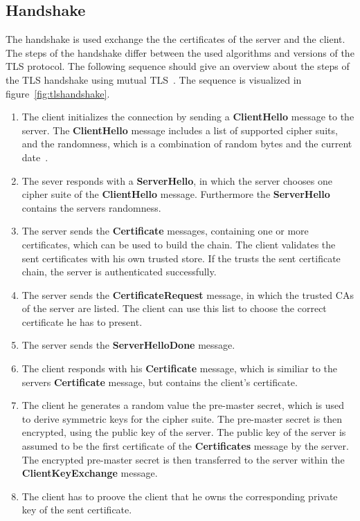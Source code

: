 \subsection{Handshake}
\label{sec:tlshandshake_details}
The handshake is used exchange the the certificates of the server and the client.
The steps of the handshake differ between the used algorithms and versions of the TLS protocol.
The following sequence should give an overview about the steps of the TLS handshake using mutual TLS~\cite{parsovs2013practical}.
The sequence is visualized in figure~\ref{fig:tlshandshake}.
\begin{enumerate}
	\item The client initializes the connection by sending a \textbf{ClientHello} message to the server.
		The \textbf{ClientHello} message includes a list of supported cipher suits, and the randomness, which is a combination of random bytes and the current date~\cite{mediumtls}.
	\item The sever responds with a \textbf{ServerHello}, in which the server chooses one cipher suite of the \textbf{ClientHello} message.
		Furthermore the \textbf{ServerHello} contains the servers randomness.
	\item The server sends the \textbf{Certificate} messages, containing one or more certificates, which can be used to build the chain.
		The client validates the sent certificates with his own trusted store.
		If the trusts the sent certificate chain, the server is authenticated successfully.
	\item The server sends the \textbf{CertificateRequest} message, in which the trusted CAs of the server are listed.
		The client can use this list to choose the correct certificate he has to present.
	\item The server sends the \textbf{ServerHelloDone} message.
	\item The client responds with his \textbf{Certificate} message, which is similiar to the servers \textbf{Certificate} message, but contains the client's certificate.
	\item The client he generates a random value the pre-master secret, which is used to derive symmetric keys for the cipher suite.
		The pre-master secret is then encrypted, using the public key of the server.
		The public key of the server is assumed to be the first certificate of the \textbf{Certificates} message by the server.
		The encrypted pre-master secret is then transferred to the server within the \textbf{ClientKeyExchange} message.
	\item The client has to proove the client that he owns the corresponding private key of the sent certificate.

\end{enumerate}
